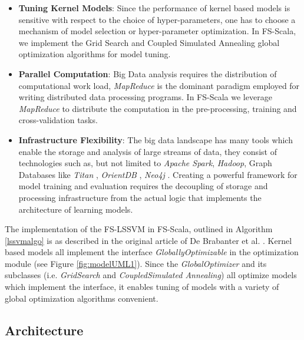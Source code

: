 \documentclass[conference, cmex10]{IEEEtran}
\begin{document}
\begin{itemize}
\item \textbf{Tuning Kernel Models}:
Since the performance of kernel based models is sensitive with respect to the choice of hyper-parameters, one has to choose a mechanism of model selection or hyper-parameter optimization. In FS-Scala, we implement the Grid Search and Coupled Simulated Annealing global optimization algorithms for model tuning.

\item \textbf{Parallel Computation}\label{mr}:
Big Data analysis requires the distribution of computational work load, \textit{MapReduce} is the dominant paradigm employed for writing distributed data processing programs. In FS-Scala we leverage \textit{MapReduce} to distribute the computation in the pre-processing, training and cross-validation tasks.

\item \textbf{Infrastructure Flexibility}:
The big data landscape has many tools which enable the storage and analysis of large streams of data, they consist of technologies such as, but not limited to \textit{Apache Spark}, \textit{Hadoop}, Graph Databases like \textit{Titan} \cite{Titan:2014}, \textit{OrientDB} \cite{OrientDB:2010}, \textit{Neo4j} \cite{Neo4j:2010}. Creating a powerful framework for model training and evaluation requires the decoupling of storage and processing infrastructure from the actual logic that implements the architecture of learning models.
\end{itemize}

The implementation of the FS-LSSVM in FS-Scala, outlined in Algorithm \ref{lssvmalgo} is as described in the original article of De Brabanter et al. \cite{DeBrabanter2010}. Kernel based models all implement the interface \textit{GloballyOptimizable} in the optimization module (see Figure \ref{fig:modelUML1}). Since the \textit{GlobalOptimizer} and its subclasses (i.e. \textit{GridSearch} and \textit{CoupledSimulated Annealing}) all optimize models which implement the  interface, it enables tuning of models with a variety of global optimization algorithms convenient.

\subsection*{Architecture} \label{archi}
\end{document}
